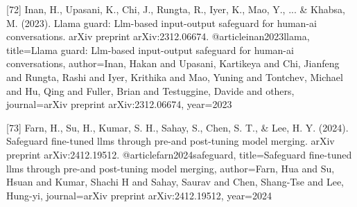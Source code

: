 \documentclass{article}
\begin{document}
{%



[72] Inan, H., Upasani, K., Chi, J., Rungta, R., Iyer, K., Mao, Y., ... & Khabsa, M. (2023). Llama guard: Llm-based input-output safeguard for human-ai conversations. arXiv preprint arXiv:2312.06674.
@article{inan2023llama,
  title={Llama guard: Llm-based input-output safeguard for human-ai conversations},
  author={Inan, Hakan and Upasani, Kartikeya and Chi, Jianfeng and Rungta, Rashi and Iyer, Krithika and Mao, Yuning and Tontchev, Michael and Hu, Qing and Fuller, Brian and Testuggine, Davide and others},
  journal={arXiv preprint arXiv:2312.06674},
  year={2023}
}

[73] Farn, H., Su, H., Kumar, S. H., Sahay, S., Chen, S. T., & Lee, H. Y. (2024). Safeguard fine-tuned llms through pre-and post-tuning model merging. arXiv preprint arXiv:2412.19512.
@article{farn2024safeguard,
  title={Safeguard fine-tuned llms through pre-and post-tuning model merging},
  author={Farn, Hua and Su, Hsuan and Kumar, Shachi H and Sahay, Saurav and Chen, Shang-Tse and Lee, Hung-yi},
  journal={arXiv preprint arXiv:2412.19512},
  year={2024}
}

}
\end{document}

